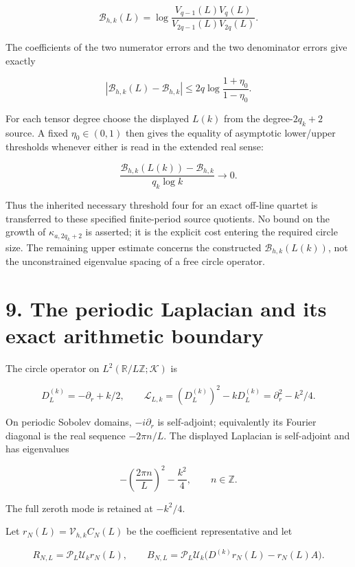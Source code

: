 \documentclass[
]{article}
\begin{document}
\[
\mathcal B_{h,k}(L)=
\log\frac{V_{q-1}(L)V_q(L)}{V_{2q-1}(L)V_{2q}(L)}.
\tag{P40}
\]

The coefficients of the two numerator errors and the two denominator
errors give exactly

\[
\boxed{\left|\mathcal B_{h,k}(L)-\mathcal B_{h,k}\right|
\le2q\log\frac{1+\eta_0}{1-\eta_0}.}
\tag{P41}
\]

For each tensor degree choose the displayed \(L(k)\) from the
degree-\(2q_k+2\) source. A fixed \(\eta_0\in(0,1)\) then gives the
equality of asymptotic lower/upper thresholds whenever either is read in
the extended real sense:

\[
\frac{\mathcal B_{h,k}(L(k))-\mathcal B_{h,k}}
{q_k\log k}\longrightarrow0.
\tag{P42}
\]

Thus the inherited necessary threshold four for an exact off-line
quartet is transferred to these specified finite-period source
quotients. No bound on the growth of \(\kappa_{a,2q_k+2}\) is asserted;
it is the explicit cost entering the required circle size. The remaining
upper estimate concerns the constructed \(\mathcal B_{h,k}(L(k))\), not
the unconstrained eigenvalue spacing of a free circle operator.

\section{9. The periodic Laplacian and its exact arithmetic
boundary}\label{the-periodic-laplacian-and-its-exact-arithmetic-boundary}

The circle operator on \(L^2(\mathbb R/L\mathbb Z;\mathcal K)\) is

\[
D_L^{(k)}=-\partial_r+k/2,\qquad
\mathscr L_{L,k}=(D_L^{(k)})^2-kD_L^{(k)}
=\partial_r^2-k^2/4.
\tag{P43}
\]

On periodic Sobolev domains, \(-i\partial_r\) is self-adjoint;
equivalently its Fourier diagonal is the real sequence \(-2\pi n/L\).
The displayed Laplacian is self-adjoint and has eigenvalues

\[
-\left(\frac{2\pi n}{L}\right)^2-\frac{k^2}{4},\qquad n\in\mathbb Z.
\tag{P44}
\]

The full zeroth mode is retained at \(-k^2/4\).

Let \(r_N(L)=\mathcal V_{h,k}C_N(L)\) be the coefficient representative
and let

\[
R_{N,L}=\mathcal P_L\mathcal U_k r_N(L),\qquad
B_{N,L}=\mathcal P_L\mathcal U_k
\bigl(D^{(k)}r_N(L)-r_N(L)A\bigr).
\tag{P45}
\]
\end{document}
